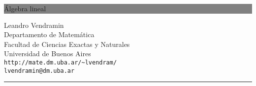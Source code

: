 

\newcommand{\HRule}[1]{\hfill \rule{0.2\linewidth}{#1}} 

\thispagestyle{empty} 

\colorbox{grey}{
\parbox[t]{1.0\linewidth}{
\centering \fontsize{50pt}{80pt}\selectfont 
\vspace*{0.7cm} 

\'Algebra lineal\par

\vspace*{0.7cm} 
}
}

\vfill 

{\centering \large 
\hfill Leandro Vendramin \\
\hfill Departamento de Matemática \\
\hfill Facultad de Ciencias Exactas y Naturales \\
\hfill Universidad de Buenos Aires \\
\hfill \verb+http://mate.dm.uba.ar/~lvendram/+ \\
\hfill \texttt{lvendramin@dm.uba.ar} \\

\HRule{1pt}} 

\clearpage 

